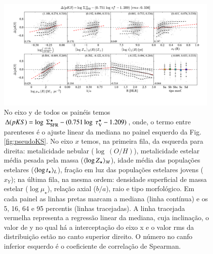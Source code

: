 \begin{figure}
	\centering
	\includegraphics[width=0.99\textwidth]{figuras/deltapKS.pdf}
	\caption[Resíduos da {\em pseudo-KS}.]
	{No eixo y de todos os painéis temos $\Delta(pKS) = \log\ \Sigma_{\mathrm{SFR}}^\star - (0.751 \log\ \tau_{\mathrm{V}}^\star -
1.209)$, onde, o termo entre parenteses é o ajuste linear da mediana no painel esquerdo da Fig.
\ref{fig:pseudoKS}. No eixo $x$ temos, na primeira fila, da esquerda para direita: metalicidade
nebular ($\log\ (O/H)$), metalicidade estelar média pesada pela massa ($\meanM{\log
Z_\star}$), idade média das populações estelares ($\meanL{\log t_\star}$), fração em luz das
populações estelares jovens ($x_Y$); na última fila, na mesma ordem: densidade superficial de massa
estelar ($\log \mu_\star$), relação axial ($b/a$), raio e tipo morfológico. Em cada painel as linhas
pretas marcam a mediana (linha contínua) e os 5, 16, 64 e 95 percentis (linhas tracejadas). A
linha tracejada vermelha representa a regressão linear da mediana, cuja inclinação, o valor de y no
qual há a interceptação do eixo x e o valor rms da distribuição estão no canto superior direito. O
número no canfo inferior esquerdo é o coeficiente de correlação de Spearman.}
	\label{fig:deltapKS}
\end{figure}

